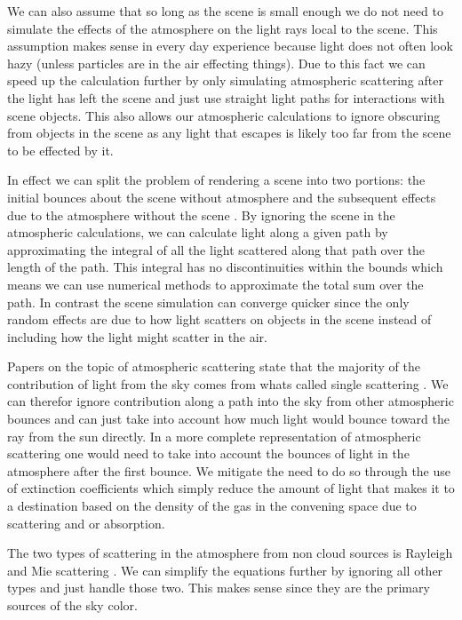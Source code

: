 \documentclass[12pt, letterpaper]{article}
\begin{document}
We can also assume that so long as the scene is small enough we do not need to
simulate the effects of the atmosphere on the light rays local to the scene.
This assumption makes sense in every day experience because light does not often
look hazy (unless particles are in the air effecting things). Due to this fact
we can speed up the calculation further by only simulating atmospheric
scattering after the light has left the scene and just use straight light paths
for interactions with scene objects. This also allows our atmospheric
calculations to ignore obscuring from objects in the scene as any light that
escapes is likely too far from the scene to be effected by it.

In effect we can split the problem of rendering a scene into two portions: the
initial bounces about the scene without atmosphere and the subsequent effects
due to the atmosphere without the scene \cite{scratch}. By ignoring the scene in
the atmospheric calculations, we can calculate light along a given path by
approximating the integral of all the light scattered along that path over the
length of the path. This integral has no discontinuities within the bounds which
means we can use numerical methods to approximate the total sum over the path.
In contrast the scene simulation can converge quicker since the only random
effects are due to how light scatters on objects in the scene instead of
including how the light might scatter in the air.

Papers on the topic of atmospheric scattering state that the majority of the
contribution of light from the sky comes from whats called single scattering
\cite{nishita}. We can therefor ignore contribution along a path into the sky
from other atmospheric bounces and can just take into account how much light
would bounce toward the ray from the sun directly. In a more complete
representation of atmospheric scattering one would need to take into account the
bounces of light in the atmosphere after the first bounce. We mitigate the need
to do so through the use of extinction coefficients which simply reduce the
amount of light that makes it to a destination based on the density of the gas
in the convening space due to scattering and or absorption.

The two types of scattering in the atmosphere from non cloud sources is Rayleigh
and Mie scattering \cite{rainbows}. We can simplify the equations further by
ignoring all other types and just handle those two. This makes sense since they
are the primary sources of the sky color.
\end{document}
